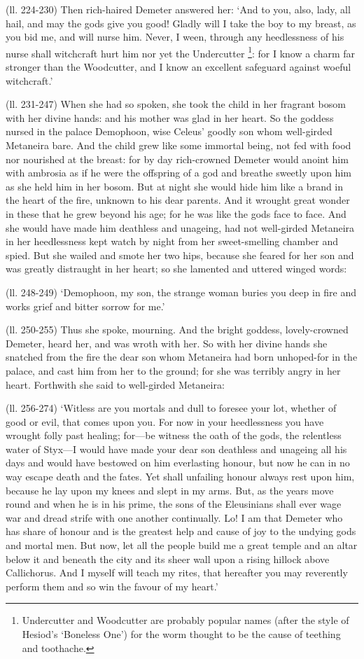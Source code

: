 (ll. 224-230) Then rich-haired Demeter answered her: ‘And to you, also,
lady, all hail, and may the gods give you good! Gladly will I take the boy to
my breast, as you bid me, and will nurse him. Never, I ween, through any
heedlessness of his nurse shall witchcraft hurt him nor yet the Undercutter \footnote{Undercutter and Woodcutter
are probably popular names (after the style of Hesiod’s ‘Boneless
One’) for the worm thought to be the cause of teething and toothache.}: for I know a charm far stronger
than the Woodcutter, and I know an excellent safeguard against woeful
witchcraft.’

(ll. 231-247) When she had so spoken, she took the child in her fragrant bosom
with her divine hands: and his mother was glad in her heart. So the goddess
nursed in the palace Demophoon, wise Celeus’ goodly son whom well-girded
Metaneira bare. And the child grew like some immortal being, not fed with food
nor nourished at the breast: for by day rich-crowned Demeter would anoint him
with ambrosia as if he were the offspring of a god and breathe sweetly upon him
as she held him in her bosom. But at night she would hide him like a brand in
the heart of the fire, unknown to his dear parents. And it wrought great wonder
in these that he grew beyond his age; for he was like the gods face to face.
And she would have made him deathless and unageing, had not well-girded
Metaneira in her heedlessness kept watch by night from her sweet-smelling
chamber and spied. But she wailed and smote her two hips, because she feared
for her son and was greatly distraught in her heart; so she lamented and
uttered winged words:

(ll. 248-249) ‘Demophoon, my son, the strange woman buries you deep in
fire and works grief and bitter sorrow for me.’

(ll. 250-255) Thus she spoke, mourning. And the bright goddess, lovely-crowned
Demeter, heard her, and was wroth with her. So with her divine hands she
snatched from the fire the dear son whom Metaneira had born unhoped-for in the
palace, and cast him from her to the ground; for she was terribly angry in her
heart. Forthwith she said to well-girded Metaneira:

(ll. 256-274) ‘Witless are you mortals and dull to foresee your lot,
whether of good or evil, that comes upon you. For now in your heedlessness you
have wrought folly past healing; for—be witness the oath of the gods, the
relentless water of Styx—I would have made your dear son deathless and
unageing all his days and would have bestowed on him everlasting honour, but
now he can in no way escape death and the fates. Yet shall unfailing honour
always rest upon him, because he lay upon my knees and slept in my arms. But,
as the years move round and when he is in his prime, the sons of the
Eleusinians shall ever wage war and dread strife with one another continually.
Lo! I am that Demeter who has share of honour and is the greatest help and
cause of joy to the undying gods and mortal men. But now, let all the people
build me a great temple and an altar below it and beneath the city and its
sheer wall upon a rising hillock above Callichorus. And I myself will teach my
rites, that hereafter you may reverently perform them and so win the favour of
my heart.’

